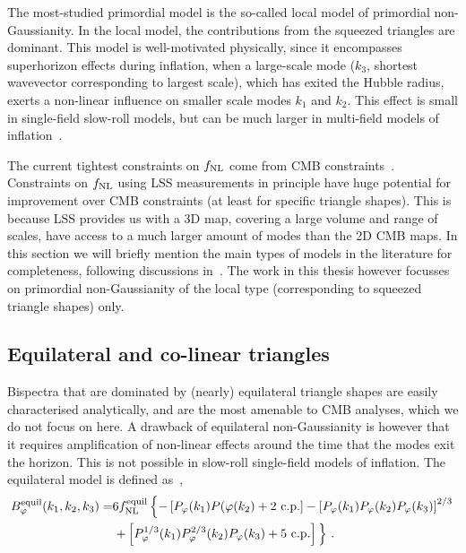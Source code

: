 The most-studied primordial model is the so-called local model of primordial non-Gaussianity. In the local model, the contributions from the squeezed triangles are dominant. This model is well-motivated physically, since it encompasses superhorizon effects during inflation, when a large-scale mode ($k_3$, shortest wavevector corresponding to largest scale), which has exited the Hubble radius, exerts a non-linear influence on smaller scale modes $k_1$ and $k_2$. This effect is small in single-field slow-roll models, but can be much larger in multi-field models of inflation~\cite{Liguori:2010hx}. 

The current tightest constraints on $f_\text{NL}$ come from CMB constraints~\cite{Planck:2019kim}. Constraints on $f_\text{NL}$ using LSS measurements in principle have huge potential for improvement over CMB constraints (at least for specific triangle shapes). This is because LSS provides us with a 3D map, covering a large volume and range of scales, have access to a much larger amount of modes than the 2D CMB maps. In this section we will briefly mention the main types of models in the literature for completeness, following discussions in~\cite{Liguori:2010hx,Fergusson:2008ra}. The work in this thesis however focusses on primordial non-Gaussianity of the local type (corresponding to squeezed triangle shapes) only. 


\subsection{Equilateral and co-linear triangles}

Bispectra that are dominated by (nearly) equilateral triangle shapes are easily characterised analytically, and are the most amenable to CMB analyses, which we do not focus on here. A drawback of equilateral non-Gaussianity is however that it requires amplification of non-linear effects around the time that the modes exit the horizon. This is not possible in slow-roll single-field models of inflation. The equilateral model is defined as~\cite{Karagiannis:2018jdt}, 
\begin{align}
	B_\varphi^\mathrm{equil}(k_1,k_2,k_3) =& 6 \fnl^\mathrm{equil} \left\{ - \left[ P_\varphi(k_1) P(\varphi(k_2) + 2\text{ c.p.} \right] - \left[ P_\varphi(k_1) P_\varphi(k_2) P_\varphi(k_3) \right]^{2/3} \right. \nonumber \\
	&\left. + \left[ P_\varphi^{1/3}(k_1) P_\varphi^{2/3}(k_2) P_\varphi(k_3) + 5\text{ c.p.} \right] \vphantom{\left[ P_\varphi \right]^{1/3}}\right\}\,.
\end{align}

